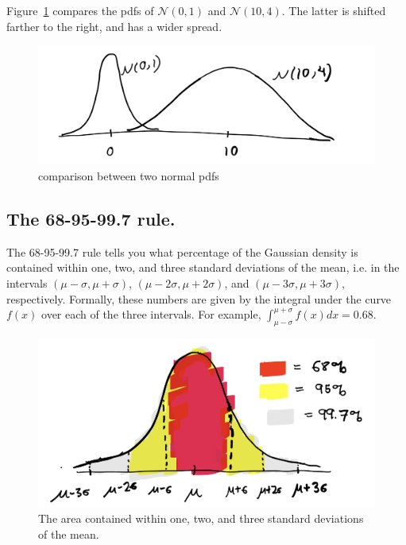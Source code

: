 \documentclass[11pt]{article}
\begin{document}
Figure~\ref{fig:2norms} compares the pdfs of $\mathcal N(0,1)$ and $\mathcal N(10,4)$. The latter is shifted farther to the right, and has a wider spread. 
\begin{figure}[h]
    \center
    \includegraphics[scale=0.1]{Images/diffdensities.png}
        \caption{comparison between two normal pdfs}
    \label{fig:2norms}
\end{figure}
%

\subsection{The 68-95-99.7 rule.}
The 68-95-99.7 rule tells you what percentage of the Gaussian density is contained within one, two, and three standard deviations of the mean, i.e. in the intervals $(\mu-\sigma,\mu+\sigma)$, $(\mu-2\sigma,\mu+2\sigma)$, and $(\mu-3\sigma,\mu+3\sigma)$, respectively. Formally, these numbers are given by the integral under the curve $f(x)$ over each of the three intervals. For example, $\int_{\mu-\sigma}^{\mu+\sigma}f(x)dx=0.68$. 
\begin{figure}[h]
    \center
    \includegraphics[scale=0.15]{Images/normalarea.png}
        \caption{The area contained within one, two, and three standard deviations of the mean.}
    \label{fig:area}
\end{figure}
\end{document}
